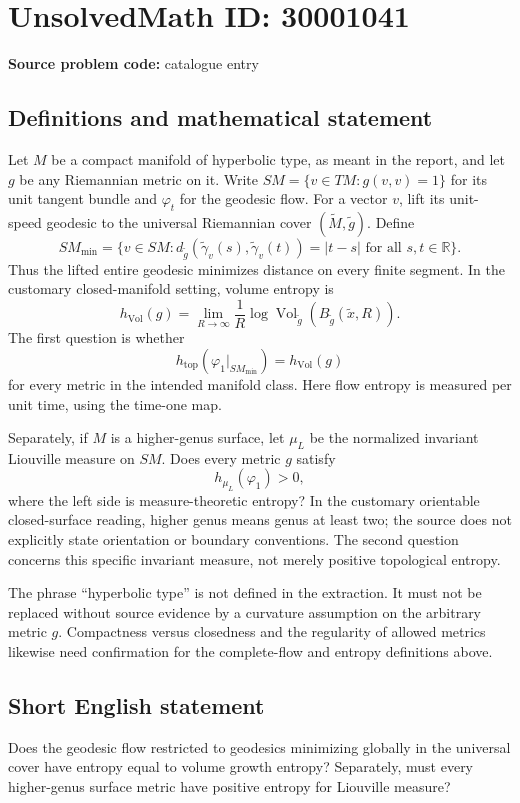 \documentclass[11pt]{article}
\newcommand{\R}{\mathbb{R}}
\begin{document}
\section*{UnsolvedMath ID: 30001041}
\textbf{Source problem code:} catalogue entry
\subsection{Definitions and mathematical statement}
Let \(M\) be a compact manifold of hyperbolic type, as meant in the report, and let \(g\) be any Riemannian metric on it. Write \(SM=\{v\in TM:g(v,v)=1\}\) for its unit tangent bundle and \(\varphi_t\) for the geodesic flow. For a vector \(v\), lift its unit-speed geodesic to the universal Riemannian cover \((\widetilde M,\widetilde g)\). Define
\[
SM_{\min}=\{v\in SM:
 d_{\widetilde g}(\widetilde\gamma_v(s),\widetilde\gamma_v(t))=|t-s|
 \text{ for all }s,t\in\R\}.
\]
Thus the lifted entire geodesic minimizes distance on every finite segment. In the customary closed-manifold setting, volume entropy is
\[
h_{\mathrm{Vol}}(g)=\lim_{R\to\infty}\frac1R
\log\operatorname{Vol}_{\widetilde g}(B_{\widetilde g}(\widetilde x,R)).
\]
The first question is whether
\[
h_{\mathrm{top}}(\varphi_1|_{SM_{\min}})=h_{\mathrm{Vol}}(g)
\]
for every metric in the intended manifold class. Here flow entropy is measured per unit time, using the time-one map.

Separately, if \(M\) is a higher-genus surface, let \(\mu_L\) be the normalized invariant Liouville measure on \(SM\). Does every metric \(g\) satisfy
\[
h_{\mu_L}(\varphi_1)>0,
\]
where the left side is measure-theoretic entropy? In the customary orientable closed-surface reading, higher genus means genus at least two; the source does not explicitly state orientation or boundary conventions. The second question concerns this specific invariant measure, not merely positive topological entropy.

The phrase ``hyperbolic type'' is not defined in the extraction. It must not be replaced without source evidence by a curvature assumption on the arbitrary metric \(g\). Compactness versus closedness and the regularity of allowed metrics likewise need confirmation for the complete-flow and entropy definitions above.
\subsection{Short English statement}
Does the geodesic flow restricted to geodesics minimizing globally in the universal cover have entropy equal to volume growth entropy? Separately, must every higher-genus surface metric have positive entropy for Liouville measure?
\end{document}
